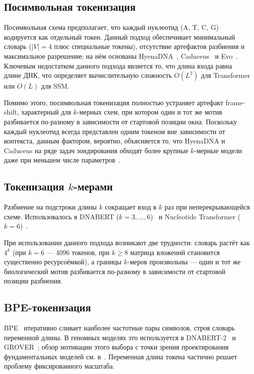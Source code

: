 \subsection{Посимвольная токенизация}

Посимвольная схема предполагает, что каждый нуклеотид (A, T, C, G)
кодируется как отдельный токен. Данный подход обеспечивает минимальный
словарь ($|V| = 4$ плюс специальные токены), отсутствие артефактов
разбиения и максимальное разрешение; на нём основаны
HyenaDNA~\cite{nguenHyenaDNALongRangeGenomic2024},
Caduceus~\cite{schiffCaduceusBiDirectionalEquivariant2024} и
Evo~\cite{nguyenSequenceModelingDesign2024}. Ключевым недостатком
данного подхода является то, что длина входа равна длине ДНК, что
определяет вычислительную сложность $O(L^2)$ для Transformer или $O(L)$ для SSM.

Помимо этого, посимвольная токенизация полностью устраняет артефакт
frame-shift, характерный для $k$-мерных схем, при котором один и тот же
мотив разбивается по-разному в зависимости от стартовой позиции окна.
Поскольку каждый нуклеотид всегда представлен одним токеном вне
зависимости от контекста, данным фактором, вероятно, объясняется то, что
HyenaDNA и Caduceus на ряде задач зондирования обходят более крупные
$k$-мерные модели даже при меньшем числе
параметров~\cite{vishniakovGenomicFoundationlessModels2024}.

\subsection{Токенизация $k$-мерами}

Разбиение на подстроки длины $k$ сокращает вход в $k$ раз при
неперекрывающейся схеме. Использовалось в DNABERT ($k = 3, \ldots,
6$)~\cite{jiDNABERTPretrainedBidirectional2021} и Nucleotide
Transformer ($k = 6$)~\cite{dalla-torreNucleotideTransformerBuilding2025}.

При использовании данного подхода возникают две трудности: словарь
растёт как $4^k$ (при $k = 6$ --- 4096 токенов, при $k \geq 8$
матрица вложений становится существенно ресурсоёмкой), а границы
$k$-меров произвольны --- один и тот же биологический мотив
разбивается по-разному в зависимости от стартовой позиции разбиения.

\subsection{BPE-токенизация}

BPE~\cite{sennrichNeuralMachineTranslation2016} итеративно сливает
наиболее частотные пары символов, строя словарь переменной длины. В
геномных моделях это используется в
DNABERT-2~\cite{zhouDNABERT2EfficientFoundation2024} и
GROVER~\cite{groverLearnsSequenceContext2024}; обзор мотивации этого
выбора с точки зрения проектирования фундаментальных моделей см.
в~\cite{chenFoundationModelsBioinformatics2024}. Переменная длина
токена частично решает проблему фиксированного масштаба.


